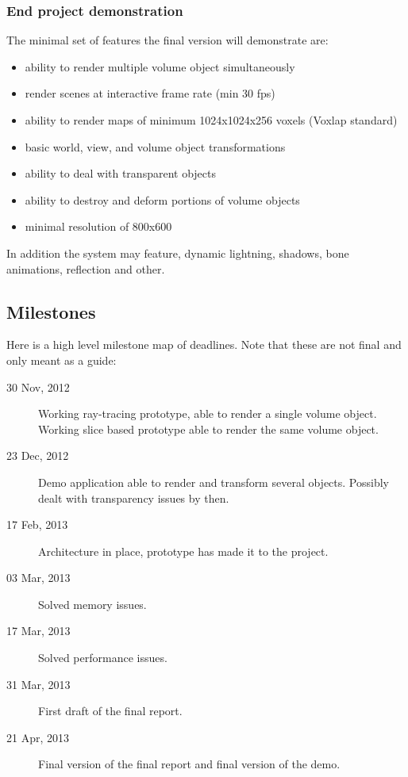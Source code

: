 \documentclass[11pt,fleqn,twoside]{article}
\begin{document}
\subsubsection{End project demonstration}
The minimal set of features the final version will demonstrate are:
\begin{itemize}
	\item ability to render multiple volume object simultaneously
	\item render scenes at interactive frame rate (min 30 fps)
	\item ability to render maps of minimum 1024x1024x256 voxels (Voxlap\cite{Voxlap} standard)
	\item basic world, view, and volume object transformations
	\item ability to deal with transparent objects
	\item ability to destroy and deform portions of volume objects
	\item minimal resolution of 800x600
\end{itemize}

In addition the system may feature, dynamic lightning, shadows, bone animations, reflection and other.


\subsection{Milestones}
Here is a high level milestone map of deadlines. Note that these are not final and only meant as a guide:

\begin{description}
	\item[30 Nov, 2012]		Working ray-tracing prototype, able to render a single volume object. 	Working slice based prototype able to render the same volume object.
	\item[23 Dec, 2012]		Demo application able to render and transform several objects. Possibly dealt with transparency issues by then.
	\item[17 Feb, 2013]		Architecture in place, prototype has made it to the project.
	\item[03 Mar, 2013]		Solved memory issues.
	\item[17 Mar, 2013]		Solved performance issues.
	\item[31 Mar, 2013]		First draft of the final report.
	\item[21 Apr, 2013]		Final version of the final report and final version of the demo. 
\end{description}
\end{document}
